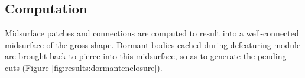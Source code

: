 \subsection{Computation}

Midsurface patches and connections are computed to result into a well-connected midsurface of the gross shape. Dormant bodies cached during defeaturing module are brought back to pierce into this midsurface, so as to generate the pending cuts (Figure  \ref{fig:results:dormantenclosure}).

\begin{figure}[!h]
\centering     %
{} \qquad
{}

\end{figure}
